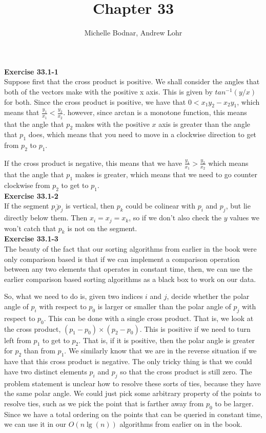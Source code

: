 \documentclass{article}
\title{Chapter 33}
\author{Michelle Bodnar, Andrew Lohr}
\begin{document}
\maketitle
\noindent\textbf{Exercise 33.1-1}\\

Suppose first that the cross product is positive. We shall consider the angles that both of the vectors make with the positive x axis. This is given by $tan^{-1}(y/x)$ for both. Since the cross product is positive, we have that $0 < x_1 y_2 - x_2y_1$, which means that $\frac{y_1}{x_1} < \frac{y_2}{x_2}$. however, since arctan is a monotone function, this means that the angle that $p_2$ makes with the positive $x$ axis is greater than the angle that $p_1$ does, which means that you need to move in a clockwise direction to get from $p_2$ to $p_1$.

If the cross product is negative, this means that we have $\frac{y_1}{x_1} > \frac{y_2}{x_2}$ which means that the angle that $p_1$ makes is greater, which means that we need to go counter clockwise from $p_2$ to get to $p_1$.\\

\noindent\textbf{Exercise 33.1-2}\\

If the segment $\overline{p_i p_j}$ is vertical, then $p_k$ could be colinear with $p_i$ and $p_j$, but lie directly below them.  Then $x_i = x_j = x_k$, so if we don't also check the $y$ values we won't catch that $p_k$ is not on the segment. \\

\noindent\textbf{Exercise 33.1-3}\\

The beauty of the fact that our sorting algorithms from earlier in the book were only comparison based is that if we can implement a comparison operation between any two elements that operates in constant time, then, we can use the earlier comparison based sorting algorithms as a black box to work on our data.

So, what we need to do is, given two indices $i$ and $j$, decide whether the polar angle of $p_i$ with respect to $p_0$ is larger or smaller than the polar angle of $p_j$ with respect to $p_0$. This can be done with a single cross product. That is, we look at the cross product, $(p_1- p_0)\times(p_2-p_0)$. This is positive if we need to turn left from $p_1$ to get to $p_2$. That is, if it is positive, then the polar angle is greater for $p_2$ than from $p_1$. We similarly know that we are in the reverse situation if we have that this cross product is negative. The only tricky thing is that we could have two distinct elements $p_i$ and $p_j$ so that the cross product is still zero. The problem statement is unclear how to resolve these sorts of ties, because they have the same polar angle. We could just pick some arbitrary property of the points to resolve ties, such as we pick the point that is farther away from $p_0$ to be larger. Since we have a total ordering on the points that can be queried in constant time, we can use it in our $O(n\lg(n))$ algorithms from earlier on in the book.\\
\end{document}
